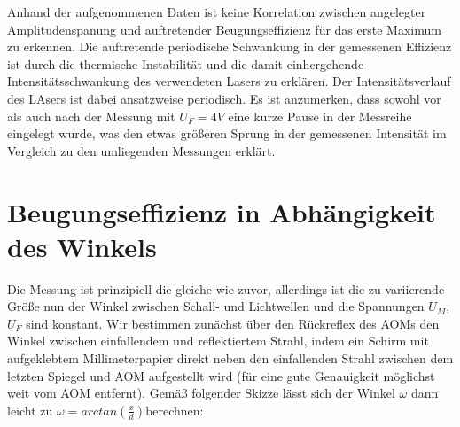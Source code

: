 \documentclass[bigchapter,colorback,accentcolor=tud4b,linedtoc,11pt]{tudreport}
\begin{document}
\begin{figure}[h]
\end{figure}
\FloatBarrier

Anhand der aufgenommenen Daten ist keine Korrelation zwischen angelegter Amplitudenspanung und auftretender Beugungseffizienz für das erste Maximum zu erkennen. Die auftretende periodische Schwankung in der gemessenen Effizienz ist durch die thermische Instabilität und die damit einhergehende Intensitätsschwankung des verwendeten Lasers zu erklären. Der Intensitätsverlauf des LAsers ist dabei ansatzweise periodisch. Es ist anzumerken, dass sowohl vor als auch nach der Messung mit $U_F = 4V$ eine kurze Pause in der Messreihe eingelegt wurde, was den etwas größeren Sprung in der gemessenen Intensität im Vergleich zu den umliegenden Messungen erklärt.

\section{Beugungseffizienz in Abhängigkeit des Winkels}

Die Messung ist prinzipiell die gleiche wie zuvor, allerdings ist die zu variierende Größe nun der Winkel zwischen Schall- und Lichtwellen und die Spannungen $U_M$, $U_F$ sind konstant. Wir bestimmen zunächst über den Rückreflex des AOMs den Winkel zwischen einfallendem und reflektiertem Strahl, indem ein Schirm mit aufgeklebtem Millimeterpapier direkt neben den einfallenden Strahl zwischen dem letzten Spiegel und AOM aufgestellt wird (für eine gute Genauigkeit möglichst weit vom AOM entfernt). Gemäß folgender Skizze lässt sich der Winkel $\omega$ dann leicht zu $\omega = arc tan (\frac{x}{d})$berechnen: 
\end{document}

